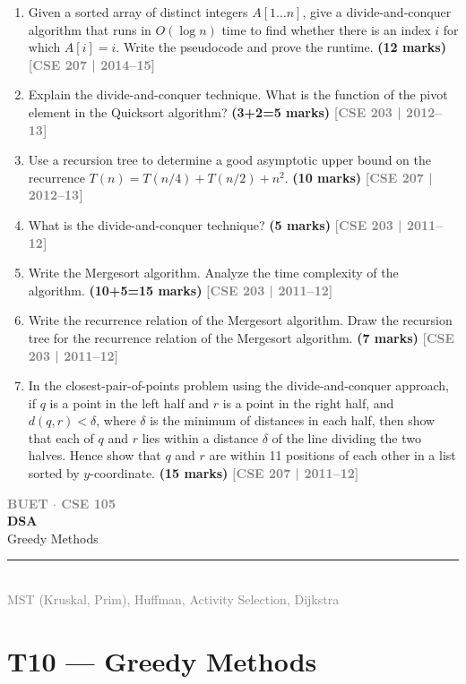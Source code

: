 \documentclass[12pt,a3paper]{article}
\newcommand{\yr}[1]{\hfill\textcolor{gray}{\small\textbf{[#1]}}}
\newcommand{\mk}[1]{\textcolor{orange!70!black}{\small\textbf{(#1 marks)}}}
\newcommand{\secdivider}[4]{%
  \newpage\thispagestyle{empty}%
  \vspace*{\fill}%
  \begin{tcolorbox}[enhanced,colback=#4!7,colframe=#3,boxrule=1.5pt,arc=8pt,
    left=20pt,right=20pt,top=22pt,bottom=22pt,
    shadow={3pt}{-3pt}{0pt}{black!15}]
    \centering
    {\large\textcolor{gray}{\textbf{BUET $\cdot$ CSE 105}}}\\[8pt]
    {\fontsize{26}{32}\selectfont\bfseries\textcolor{#3}{DSA}}\\[6pt]
    {\fontsize{15}{19}\selectfont\textcolor{dgray}{#1}}\\[12pt]
    \textcolor{#3!60}{\rule{0.5\textwidth}{0.5pt}}\\[6pt]
    {\small\textcolor{gray}{#2}}
  \end{tcolorbox}%
  \vspace*{\fill}\newpage%
}
\begin{document}
\begin{enumerate}
\item Given a sorted array of distinct integers $A[1 \ldots n]$, give a divide-and-conquer algorithm that runs in $O(\log n)$ time to find whether there is an index $i$ for which $A[i] = i$. Write the pseudocode and prove the runtime. \mk{12}
\yr{CSE 207 | 2014--15}

\item Explain the divide-and-conquer technique. What is the function of the pivot element in the Quicksort algorithm? \mk{3+2=5}
\yr{CSE 203 | 2012--13}

\item Use a recursion tree to determine a good asymptotic upper bound on the recurrence $T(n) = T(n/4) + T(n/2) + n^2$. \mk{10}
\yr{CSE 207 | 2012--13}

\item What is the divide-and-conquer technique? \mk{5}
\yr{CSE 203 | 2011--12}

\item Write the Mergesort algorithm. Analyze the time complexity of the algorithm. \mk{10+5=15}
\yr{CSE 203 | 2011--12}

\item Write the recurrence relation of the Mergesort algorithm. Draw the recursion tree for the recurrence relation of the Mergesort algorithm. \mk{7}
\yr{CSE 203 | 2011--12}

\item In the closest-pair-of-points problem using the divide-and-conquer approach, if $q$ is a point in the left half and $r$ is a point in the right half, and $d(q,r) < \delta$, where $\delta$ is the minimum of distances in each half, then show that each of $q$ and $r$ lies within a distance $\delta$ of the line dividing the two halves. Hence show that $q$ and $r$ are within 11 positions of each other in a list sorted by $y$-coordinate. \mk{15}
\yr{CSE 207 | 2011--12}

\end{enumerate}
\newpage

\secdivider{Greedy Methods}{MST (Kruskal, Prim), Huffman, Activity Selection, Dijkstra}{cC}{cC}
\label{sec:T10}
\section{T10 --- Greedy Methods}
\end{document}
